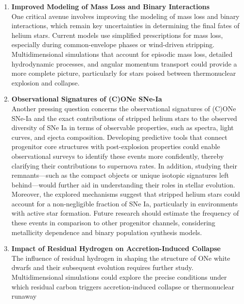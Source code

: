 \documentclass[main.tex]{subfiles}
\begin{document}
    \begin{enumerate}
        \item \textbf{Improved Modeling of Mass Loss and Binary Interactions}\\
        One critical avenue involves improving the modeling of mass loss and binary interactions, which remain key uncertainties in determining the final fates of helium stars. Current models use simplified prescriptions for mass loss, especially during common-envelope phases or wind-driven stripping. Multidimensional simulations that account for episodic mass loss, detailed hydrodynamic processes, and angular momentum transport could provide a more complete picture, particularly for stars poised between thermonuclear explosion and collapse.

        \item \textbf{Observational Signatures of (C)ONe SNe-Ia}\\
        Another pressing question concerns the observational signatures of (C)ONe SNe-Ia and the exact contributions of stripped helium stars to the observed diversity of SNe Ia in terms of observable properties, such as spectra, light curves, and ejecta composition.
        Developing predictive tools that connect progenitor core structures with post-explosion properties could enable observational surveys to identify these events more confidently, thereby clarifying their contributions to supernova rates. In addition, studying their remnants---such as the compact objects or unique isotopic signatures left behind---would further aid in understanding their roles in stellar evolution.
        Moreover, the explored mechanisms suggest that stripped helium stars could account for a non-negligible fraction of SNe Ia, particularly in environments with active star formation. Future research should estimate the frequency of these events in comparison to other progenitor channels, considering metallicity dependence and binary population synthesis models.

        \item \textbf{Impact of Residual Hydrogen on Accretion-Induced Collapse}\\
        The influence of residual hydrogen in shaping the structure of ONe white dwarfs and their subsequent evolution requires further study. Multidimensional simulations could explore the precise conditions under which residual carbon triggers accretion-induced collapse or thermonuclear runaway


\end{enumerate}
\end{document}

